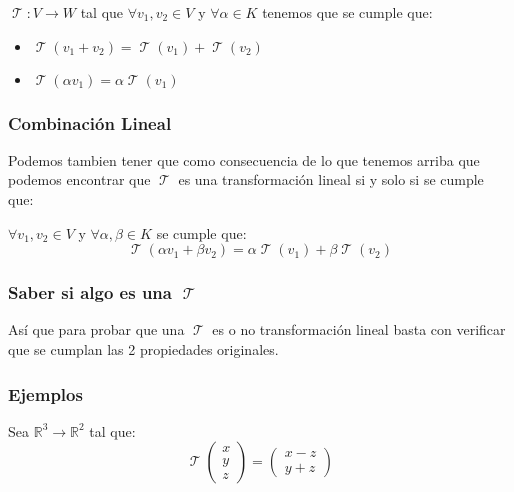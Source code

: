 \documentclass[12pt]{report}                                    %
\DeclareMathOperator \LinealTransformation {\mathcal{T}}
\begin{document}
        $\LinealTransformation: V \to W $ tal que $\forall v_1, v_2 \in V $ y $\forall \alpha \in K$
        tenemos que se cumple que:

        \begin{itemize}
            \item $\LinealTransformation (v_1 + v_2) = \LinealTransformation(v_1) + \LinealTransformation(v_2)$
            \item $\LinealTransformation (\alpha v_1) = \alpha \LinealTransformation(v_1)$ 
        \end{itemize}

        \subsubsection{Combinación Lineal}
        Podemos tambien tener que como consecuencia de lo que tenemos arriba que podemos
        encontrar que $\LinealTransformation$ es una transformación lineal si y solo si se cumple que:

        $\forall v_1, v_2 \in V$ y $\forall \alpha, \beta \in K$ se cumple que:
        \begin{equation}
            \LinealTransformation(\alpha v_1 + \beta v_2) = \alpha \LinealTransformation(v_1) + \beta \LinealTransformation(v_2)
        \end{equation}

        \subsubsection{Saber si algo es una $\LinealTransformation$}
        Así que para probar que una $\LinealTransformation$ es o no transformación lineal basta con verificar
        que se cumplan las 2 propiedades originales. 

        \clearpage
        \subsubsection{Ejemplos}
            Sea $\mathbb{R}^3 \to \mathbb{R}^2$ tal que:
            \begin{equation*}
                \LinealTransformation\left( \begin{matrix} x\\y\\z \end{matrix} \right) =
                \left( \begin{matrix} x-z\\y+z \end{matrix} \right)
            \end{equation*}
\end{document}
